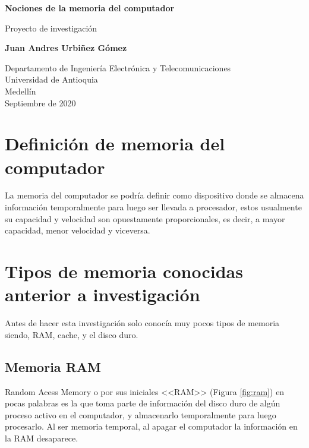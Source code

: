 \documentclass{article}
\begin{document}
\begin{titlepage}
    \begin{center}
        \vspace*{1cm}
            
        \Huge
        \textbf{Nociones de la memoria del computador}
            
        \vspace{0.5cm}
        \LARGE
        Proyecto de investigación
            
        \vspace{1.5cm}
            
        \textbf{Juan Andres Urbiñez Gómez}
            
        \vfill
            
        \vspace{0.8cm}
            
        \Large
        Departamento de Ingeniería Electrónica y Telecomunicaciones\\
        Universidad de Antioquia\\
        Medellín\\
        Septiembre de 2020
            
    \end{center}
\end{titlepage}

\tableofcontents
\newpage
\section{Definición de memoria del computador}
La memoria del computador se podría definir como dispositivo donde se almacena información temporalmente para luego ser llevada a procesador, estos usualmente su capacidad y velocidad son opuestamente proporcionales, es decir, a mayor capacidad, menor velocidad y viceversa.
\section{Tipos de memoria conocidas anterior a investigación} 
Antes de hacer esta investigación solo conocía muy pocos tipos de memoria siendo, RAM, cache, y el disco duro.

\subsection{Memoria RAM}
Random Acess Memory o por sus iniciales <<RAM>> (Figura \ref{fig:ram}) en pocas palabras es la que toma parte de información del disco duro de algún proceso activo en el computador, y almacenarlo temporalmente para luego procesarlo. Al ser memoria temporal, al apagar el computador la información en la RAM  desaparece.
\end{document}
